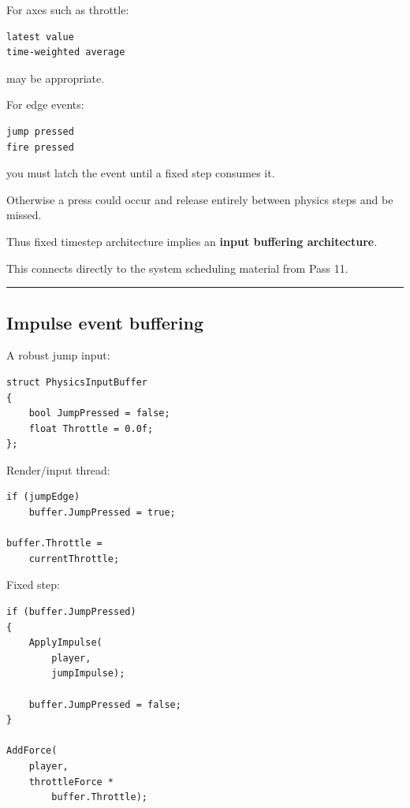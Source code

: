 For axes such as throttle:

\begin{verbatim}
latest value
time-weighted average
\end{verbatim}

may be appropriate.

For edge events:

\begin{verbatim}
jump pressed
fire pressed
\end{verbatim}

you must latch the event until a fixed step consumes it.

Otherwise a press could occur and release entirely between physics steps and be missed.

Thus fixed timestep architecture implies an \textbf{input buffering architecture}.

This connects directly to the system scheduling material from Pass 11.

\begin{center}\rule{0.5\linewidth}{0.5pt}\end{center}

\subsection{Impulse event buffering}\label{06-engine-ii-ch038-impulse-event-buffering}

\hypertarget{06-engine-ii-ch038-impulse-event-buffering}{}

A robust jump input:

\begin{verbatim}
struct PhysicsInputBuffer
{
    bool JumpPressed = false;
    float Throttle = 0.0f;
};
\end{verbatim}

Render/input thread:

\begin{verbatim}
if (jumpEdge)
    buffer.JumpPressed = true;

buffer.Throttle =
    currentThrottle;
\end{verbatim}

Fixed step:

\begin{verbatim}
if (buffer.JumpPressed)
{
    ApplyImpulse(
        player,
        jumpImpulse);

    buffer.JumpPressed = false;
}

AddForce(
    player,
    throttleForce *
        buffer.Throttle);
\end{verbatim}

